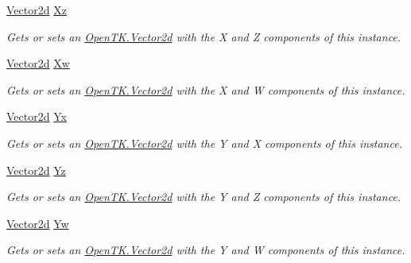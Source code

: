 \begin{DoxyCompactItemize}
\hyperlink{struct_open_t_k_1_1_vector2d}{Vector2d} \hyperlink{struct_open_t_k_1_1_vector4d_ae7d2a85a63e048b3acd04ee07d2913d2}{Xz}
\begin{DoxyCompactList}\small\item\em Gets or sets an \hyperlink{struct_open_t_k_1_1_vector2d}{Open\-T\-K.\-Vector2d} with the X and Z components of this instance. \end{DoxyCompactList}\item 
\hyperlink{struct_open_t_k_1_1_vector2d}{Vector2d} \hyperlink{struct_open_t_k_1_1_vector4d_ac51d6b06d0055c5fdb454ef012693062}{Xw}
\begin{DoxyCompactList}\small\item\em Gets or sets an \hyperlink{struct_open_t_k_1_1_vector2d}{Open\-T\-K.\-Vector2d} with the X and W components of this instance. \end{DoxyCompactList}\item 
\hyperlink{struct_open_t_k_1_1_vector2d}{Vector2d} \hyperlink{struct_open_t_k_1_1_vector4d_a646a3b4894af900f5bc9e42da9609e7c}{Yx}
\begin{DoxyCompactList}\small\item\em Gets or sets an \hyperlink{struct_open_t_k_1_1_vector2d}{Open\-T\-K.\-Vector2d} with the Y and X components of this instance. \end{DoxyCompactList}\item 
\hyperlink{struct_open_t_k_1_1_vector2d}{Vector2d} \hyperlink{struct_open_t_k_1_1_vector4d_aa91df7bb24a70c567bc157fd98c54b96}{Yz}
\begin{DoxyCompactList}\small\item\em Gets or sets an \hyperlink{struct_open_t_k_1_1_vector2d}{Open\-T\-K.\-Vector2d} with the Y and Z components of this instance. \end{DoxyCompactList}\item 
\hyperlink{struct_open_t_k_1_1_vector2d}{Vector2d} \hyperlink{struct_open_t_k_1_1_vector4d_a2568d72f35a644ab2e84e73332934492}{Yw}
\begin{DoxyCompactList}\small\item\em Gets or sets an \hyperlink{struct_open_t_k_1_1_vector2d}{Open\-T\-K.\-Vector2d} with the Y and W components of this instance. \end{DoxyCompactList}\item 

\end{DoxyCompactItemize}
